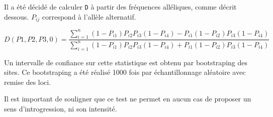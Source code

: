 
Il a été décidé de calculer \verb|D| à partir des fréquences alléliques, comme décrit dessous.
 \textit{$P_{ij}$} correspond à l'allèle alternatif.

\[D(P1,P2,P3,0)=\frac{\sum_{i=1}^{n} (1-P_{i1})P_{i2}P_{i3}(1-P_{i4})-P_{i1}(1-P_{i2})P_{i3}(1-P_{i4})}{\sum_{i=1}^{n} (1-P_{i1})P_{i2}P_{i3}(1-P_{i4})+P_{i1}(1-P_{i2})P_{i3}(1-P_{i4})}\]

Un intervalle de confiance sur cette statistique est obtenu par bootstraping des sites. Ce bootstraping a été réalisé 1000 fois par échantillonnage aléatoire avec remise des loci.

Il est important de souligner que ce test ne permet en aucun cas de proposer un sens d'introgression, ni son intensité.


